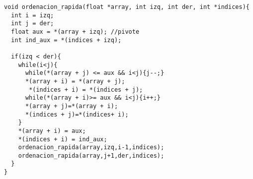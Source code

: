 \begin{lstlisting}
void ordenacion_rapida(float *array, int izq, int der, int *indices){
  int i = izq;
  int j = der;
  float aux = *(array + izq); //pivote
  int ind_aux = *(indices + izq);

  if(izq < der){
    while(i<j){
      while(*(array + j) <= aux && i<j){j--;}
      *(array + i) = *(array + j);
       *(indices + i) = *(indices + j);
      while(*(array + i)>= aux && i<j){i++;}
      *(array + j)=*(array + i);
      *(indices + j)=*(indices+ i);
    }
    *(array + i) = aux;
    *(indices + i) = ind_aux;
    ordenacion_rapida(array,izq,i-1,indices);
    ordenacion_rapida(array,j+1,der,indices);
  }
}
\end{lstlisting}

